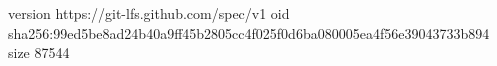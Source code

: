 version https://git-lfs.github.com/spec/v1
oid sha256:99ed5be8ad24b40a9ff45b2805cc4f025f0d6ba080005ea4f56e39043733b894
size 87544
